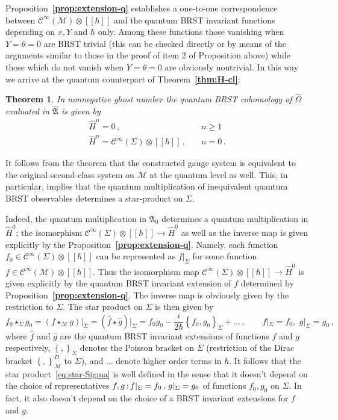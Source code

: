 \documentclass[a4paper,11pt]{amsart}
\newtheorem{thm}{Theorem}
\numberwithin{thm}{section} %
\numberwithin{equation}{section} %
\numberwithin{figure}{section} %
\newcommand{\bref}[1]{{\bf \ref{#1}}}
\newcommand{\pb}[2]{\left\{{}#1{},{}#2{}\right\}}
\renewcommand{\:}{{\rm\, :\,}}
\newcommand{\func}[1]{{{\mathcal C}^\infty}{(#1)}}             %
\def\tensor{\otimes}
\def\manM{{\mathcal M}}
\def\aA{{ \mathfrak A}}
\def\qA{{\hat{\mathfrak A}}}
\begin{document}
Proposition~\bref{prop:extension-q}
establishes a one-to-one correspondence between $\func{\manM}\tensor
[[\hbar]]$ and the quantum BRST invariant functions depending
on $x,Y$ and $\hbar$ only. Among these functions those vanishing
when $Y=\theta=0$ are BRST trivial (this can be checked directly
or by means of the arguments similar to those in the proof of
item 2 of Proposition above) while those which do not
vanish when $Y=\theta=0$ are obviously nontrivial. In this way we
arrive at the quantum counterpart of Theorem~\bref{thm:H-cl}:
\begin{thm}\label{thm:H-q}
In nonnegative ghost number the quantum BRST cohomology
of $\hat\Omega$ evaluated in $\qA$ is given by
\begin{equation}
\begin{split}
{\hat H}^n=0\,,&\quad n\geq 1\\
{\hat H}^n=\func{\Sigma}\tensor[[\hbar]]\,, & \quad n=0\,.
\end{split}
\end{equation}
\end{thm}
It follows from the theorem that the constructed gauge
system is equivalent to the original second-class system
on $\manM$ at the quantum level as well. This, in particular,
implies that the quantum multiplication of inequivalent quantum BRST
observables determines a star-product on $\Sigma$.

Indeed, the quantum multiplication in $\aA_0$ determines a
quantum multiplication in ${\hat H}^{0}$;
the isomorphism $\func{\Sigma}\tensor[[\hbar]] \to {\hat H}^0$
as well as the inverse map is given explicitly by
the Proposition~\bref{prop:extension-q}.  Namely, each function
$f_0\in \func{\Sigma}\tensor[[\hbar]]$ can be represented as
$f|_{\Sigma}$ for some function
$f\in\func{\manM}\tensor[[\hbar]]$. Thus the isomorphism map
$\func{\Sigma}\tensor[[\hbar]]\to {\hat H}^0$
is given explicitly by the quantum BRST invariant
extension of $f$ determined by Proposition~\bref{prop:extension-q}.
The inverse map is obviously given by the restriction to $\Sigma$.
The star product on $\Sigma$ is then given by
\begin{equation}
\label{eq:star-Sigma}
f_0 \star_\Sigma g_0 = (f \star_\manM g){\bigr|}_\Sigma=
({\hat f}\star{\hat g}){\bigr|}_{\Sigma} =
f_0 g_0-\frac{i}{2\hbar}\pb{f_0}{g_0}_{\Sigma}+\ldots\,,\qquad
f|_{\Sigma}=f_0,\,\,  g|_{\Sigma}=g_0\,,
\end{equation}
where $\hat f$ and $\hat g$ are the quantum BRST invariant
extensions of functions $f$ and $g$ respectively,
$\pb{}{}_\Sigma$ denotes the Poisson bracket on $\Sigma$
(restriction of the Dirac bracket $\pb{}{}^D_\manM$ to $\Sigma$),
and $\ldots$ denote higher order terms in $\hbar$.
It follows that the star product~\eqref{eq:star-Sigma} is well defined
in the sense that it doesn't depend on the choice of
representatives $f,g\:f|_{\Sigma}=f_0\,,\,g|_{\Sigma}=g_0$ of functions
$f_0,g_0$ on $\Sigma$. In fact, it also doesn't depend on the choice of
a BRST invariant extensions for $f$ and $g$.
\end{document}
